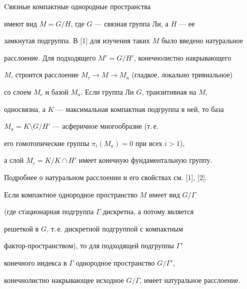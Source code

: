 

\pagestyle{plain} %







\maketitle


\label{begin}








Cвязные компактные однородные пространства


имеют вид $M=G/H$, где $G$ --- связная группа Ли, а $H$ --- ее


замкнутая подгруппа. В [1] для изучения таких $M$ было введено натуральное


расслоение. Для подходящего $M'=G/H'$, конечнолистно накрывающего


$M$, строится расслоение $M_c \to M \to M_a$ (гладкое, локально тривиальное)


со слоем $M_c$ и базой $M_a$. Если группа Ли $G$, транзитивная на $M$,


односвязна, а $K$ --- максимальная компактная подгруппа в ней, то база


$M_a=K \setminus G / H'$ --- асферичное многообразие (т.\,е.


его гомотопические группы $\pi_i (M_a)=0$ при всех $i > 1$),


а слой $M_c=K/K\cap H'$ имеет конечную фундаментальную группу.


Подробнее о натуральном расслоении и его свойствах см. [1], [2].


Если компактное однородное пространство $M$ имеет вид $G/\Gamma$


(где стационарная подгруппа $\Gamma$ дискретна, а потому является


решеткой в $G$, т.\,е. дискретной подгруппой с компактным


фактор-пространством), то для подходящей подгруппы $\Gamma'$


конечного индекса в $\Gamma$ однородное пространство $G/\Gamma'$,


конечнолистно накрывающее исходное $G/\Gamma$, имеет натуральное расслоение.





